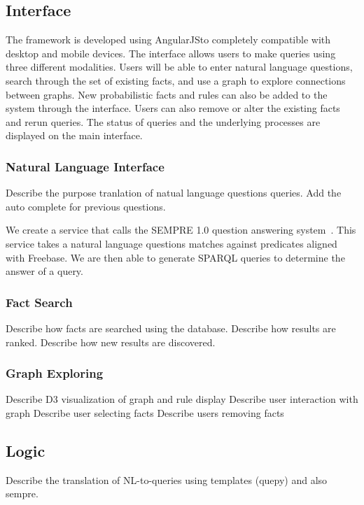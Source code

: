 \subsection{Interface}

The framework is developed using AngularJS\@ to completely compatible with desktop and mobile devices.
The interface allows users to make queries using three different modalities.
Users will be able to enter natural language questions, search through the set of existing facts, and use a graph to explore connections between graphs.
New probabilistic facts and rules can also be added to the system through the interface.
Users can also remove or alter the existing facts and rerun queries.
The status of queries and the underlying processes are displayed on the main interface.


\subsubsection{Natural Language Interface}
Describe the purpose tranlation of natual language questions queries.
Add the auto complete for previous questions.


We create a service that calls the SEMPRE 1.0 question answering system~\cite{berant2013freebase,berant2013semantic}.
This service takes a natural language questions matches against predicates aligned with Freebase.
We are then able to generate SPARQL queries to determine the answer of a query.



\subsubsection{Fact Search}
Describe how facts are searched using the database.
Describe how results are ranked.
Describe how new results are discovered.
\subsubsection{Graph Exploring}
Describe D3 visualization of graph and rule display
Describe user interaction with graph
Describe user selecting facts
Describe users removing facts


\subsection{Logic}
Describe the translation of NL-to-queries using templates (quepy) and also sempre.

